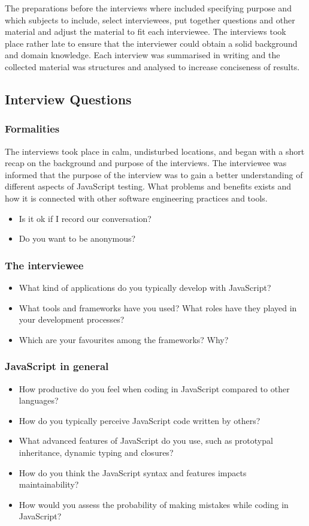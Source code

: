 \documentclass[11pt]{article}
\begin{document}
The preparations before the interviews where included specifying purpose and which subjects to include, select interviewees, put together questions and other material and adjust the material to fit each interviewee. The interviews took place rather late to ensure that the interviewer could obtain a solid background and domain knowledge. Each interview was summarised in writing and the collected material was structures and analysed to increase conciseness of results.

\subsection{Interview Questions}

\subsubsection{Formalities}
The interviews took place in calm, undisturbed locations, and began with a short recap on the background and purpose of the interviews. The interviewee was informed that the purpose of the interview was to gain a better understanding of different aspects of JavaScript testing. What problems and benefits exists and how it is connected with other software engineering practices and tools.

\begin{itemize}
\item Is it ok if I record our conversation?
\item Do you want to be anonymous?
\end{itemize}

\subsubsection{The interviewee}
\begin{itemize}
\item What kind of applications do you typically develop with JavaScript?
\item What tools and frameworks have you used? What roles have they played in your development processes?
\item Which are your favourites among the frameworks? Why?
\end{itemize}

\subsubsection{JavaScript in general}
\begin{itemize}
\item How productive do you feel when coding in JavaScript compared to other languages?
\item How do you typically perceive JavaScript code written by others?
\item What advanced features of JavaScript do you use, such as prototypal inheritance, dynamic typing and closures?
\item How do you think the JavaScript syntax and features impacts maintainability?
\item How would you assess the probability of making mistakes while coding in JavaScript?
\end{itemize}
\end{document}
